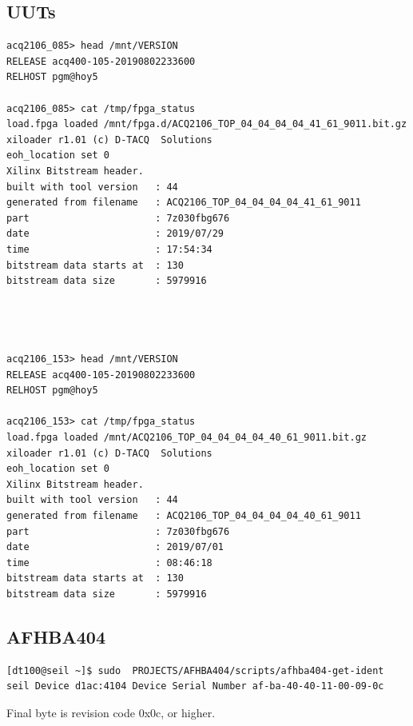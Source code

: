 \documentclass{article}
\begin{document}
\subsection{UUTs}
\begin{verbatim}
acq2106_085> head /mnt/VERSION 
RELEASE acq400-105-20190802233600
RELHOST pgm@hoy5

acq2106_085> cat /tmp/fpga_status 
load.fpga loaded /mnt/fpga.d/ACQ2106_TOP_04_04_04_04_41_61_9011.bit.gz
xiloader r1.01 (c) D‑TACQ  Solutions
eoh_location set 0
Xilinx Bitstream header.
built with tool version   : 44
generated from filename   : ACQ2106_TOP_04_04_04_04_41_61_9011
part                      : 7z030fbg676
date                      : 2019/07/29
time                      : 17:54:34
bitstream data starts at  : 130
bitstream data size       : 5979916




acq2106_153> head /mnt/VERSION 
RELEASE acq400-105-20190802233600
RELHOST pgm@hoy5

acq2106_153> cat /tmp/fpga_status 
load.fpga loaded /mnt/ACQ2106_TOP_04_04_04_04_40_61_9011.bit.gz
xiloader r1.01 (c) D‑TACQ  Solutions
eoh_location set 0
Xilinx Bitstream header.
built with tool version   : 44
generated from filename   : ACQ2106_TOP_04_04_04_04_40_61_9011
part                      : 7z030fbg676
date                      : 2019/07/01
time                      : 08:46:18
bitstream data starts at  : 130
bitstream data size       : 5979916
\end{verbatim}

\subsection{AFHBA404}

\begin{verbatim}
[dt100@seil ~]$ sudo  PROJECTS/AFHBA404/scripts/afhba404-get-ident 
seil Device d1ac:4104 Device Serial Number af-ba-40-40-11-00-09-0c
\end{verbatim}
Final byte is revision code 0x0c, or higher.
\end{document}
